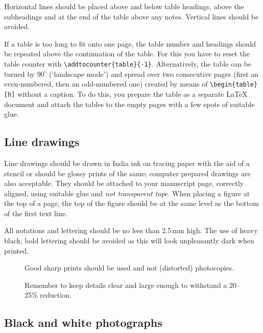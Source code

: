 Horizontal lines should be placed above and below table headings, above
the subheadings and at the end of the table above any notes. Vertical
lines should be avoided.

If a table is too long to fit onto one page, the table number and
headings should be repeated above the continuation of the table. For
this you have to reset the table counter with
\verb|\addtocounter{table}{-1}|. Alternatively, the table can be turned
by $90^\circ$ (`landscape mode') and spread over two consecutive pages
(first an even-numbered, then an odd-numbered one) created by means of
\verb|\begin{table}[h]| without a caption. To do this, you prepare the
table as a separate \LaTeX{} document and attach the tables to the
empty pages with a few spots of suitable glue.

\subsection{Line drawings}

Line drawings should be drawn in India ink on tracing paper with the
aid of a stencil or should be glossy prints of the same; computer
prepared drawings are also acceptable. They should be attached to your
manuscript page, correctly aligned, using suitable glue and {\em not
transparent tape}. When placing a figure at the top of a page, the top
of the figure should be at the same level as the bottom of the first
text line.

All notations and lettering should be no less than 2.5\,mm high. The use
of heavy black, bold lettering should be avoided as this will look
unpleasantly dark when printed.

\begin{figure}[htb]
\begin{minipage}[t]{80mm}
\framebox[79mm]{\rule[-26mm]{0mm}{52mm}}
\caption{Good sharp prints should be used and not (distorted) photocopies.}
\label{fig:largenenough}
\end{minipage}
%
\hspace{\fill}
%
\begin{minipage}[t]{75mm}
\framebox[74mm]{\rule[-26mm]{0mm}{52mm}}
\caption{Remember to keep details clear and large enough to
         withstand a 20--25\% reduction.}
\label{fig:toosmall}
\end{minipage}
\end{figure}

\subsection{Black and white photographs}

